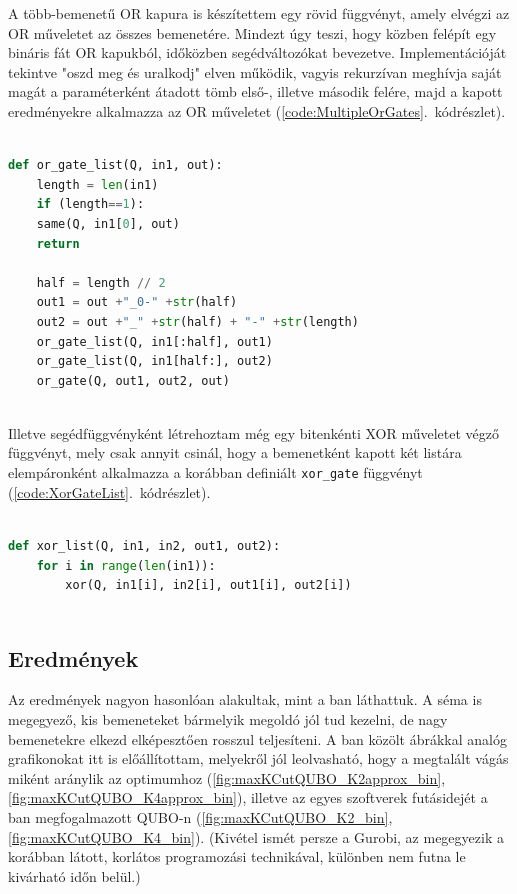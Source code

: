 A több-bemenetű OR kapura is készítettem egy rövid függvényt, amely elvégzi az OR műveletet az összes bemenetére. Mindezt úgy teszi, hogy közben felépít egy bináris fát OR kapukból, időközben segédváltozókat bevezetve. Implementációját tekintve "oszd meg és uralkodj" elven működik, vagyis rekurzívan meghívja saját magát a paraméterként átadott tömb első-, illetve második felére, majd a kapott eredményekre alkalmazza az OR műveletet (\ref{code:MultipleOrGates}.~kódrészlet).

\begin{lstlisting}[language=python,caption=Sokbemenetes OR kapu,label=code:MultipleOrGates]
	
def or_gate_list(Q, in1, out):
	length = len(in1)
	if (length==1):
	same(Q, in1[0], out)
	return
	
	half = length // 2
	out1 = out +"_0-" +str(half)  
	out2 = out +"_" +str(half) + "-" +str(length)
	or_gate_list(Q, in1[:half], out1)
	or_gate_list(Q, in1[half:], out2)
	or_gate(Q, out1, out2, out)
	
\end{lstlisting}

Illetve segédfüggvényként létrehoztam még egy bitenkénti XOR műveletet végző függvényt, mely csak annyit csinál, hogy a bemenetként kapott két listára elempáronként alkalmazza a korábban definiált \verb+xor_gate+ függvényt (\ref{code:XorGateList}.~kódrészlet).

\begin{lstlisting}[language=python,caption=Bitenkénti XOR művelet,label=code:XorGateList]
	
def xor_list(Q, in1, in2, out1, out2):
	for i in range(len(in1)):
		xor(Q, in1[i], in2[i], out1[i], out2[i])
	
\end{lstlisting}

\subsection{Eredmények}

Az eredmények nagyon hasonlóan alakultak, mint a ban láthattuk. A séma is megegyező, kis bemeneteket bármelyik megoldó jól tud kezelni, de nagy bemenetekre elkezd elképesztően rosszul teljesíteni. A ban közölt ábrákkal analóg grafikonokat itt is előállítottam, melyekről jól leolvasható, hogy a megtalált vágás miként aránylik az optimumhoz (\ref{fig:maxKCutQUBO_K2approx_bin}, \ref{fig:maxKCutQUBO_K4approx_bin}), illetve az egyes szoftverek futásidejét a ban megfogalmazott QUBO-n (\ref{fig:maxKCutQUBO_K2_bin}, \ref{fig:maxKCutQUBO_K4_bin}). (Kivétel ismét persze a Gurobi, az megegyezik a korábban látott, korlátos programozási technikával, különben nem futna le kivárható időn belül.)

